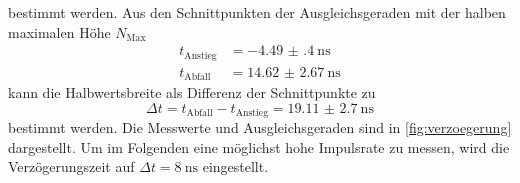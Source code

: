 bestimmt werden.
Aus den Schnittpunkten der Ausgleichsgeraden mit der halben maximalen Höhe $N_\text{Max}$
\begin{align*}
    t_\text{Anstieg} &= \qty{-4.49(40)}{\nano\second} \\
    t_\text{Abfall} &= \qty{14.62(267)}{\nano\second}
\end{align*}
kann die Halbwertsbreite als Differenz der Schnittpunkte zu
\begin{equation}
    \Delta t = t_\text{Abfall} - t_\text{Anstieg} = \qty{19.11(270)}{\nano\second}
\end{equation}
bestimmt werden.
Die Messwerte und Ausgleichsgeraden sind in \autoref{fig:verzoegerung} dargestellt.
Um im Folgenden eine möglichst hohe Impulsrate zu messen, wird die Verzögerungszeit auf $\Delta t = \qty{8}{\nano\second}$ eingestellt.%
\FloatBarrier

